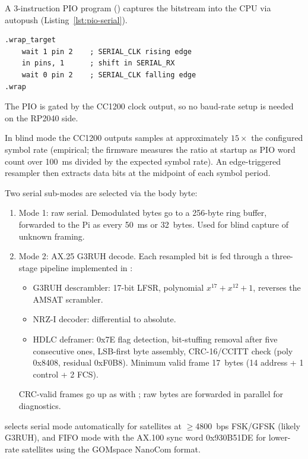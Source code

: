 A 3-instruction PIO program () captures the bitstream into the CPU via autopush (Listing~\ref{lst:pio-serial}).

\begin{lstlisting}[language={[x86masm]Assembler},
    caption={PIO program: clock-synchronous bit capture from the CC1200.},
    label={lst:pio-serial}]
.wrap_target
    wait 1 pin 2    ; SERIAL_CLK rising edge
    in pins, 1      ; shift in SERIAL_RX
    wait 0 pin 2    ; SERIAL_CLK falling edge
.wrap
\end{lstlisting}

The PIO is gated by the CC1200 clock output, so no baud-rate setup is needed on the RP2040 side.

In blind mode the CC1200 outputs samples at approximately $15\times$ the configured symbol rate (empirical; the firmware measures the ratio at startup as PIO word count over 100~ms divided by the expected symbol rate). An edge-triggered resampler then extracts data bits at the midpoint of each symbol period.

Two serial sub-modes are selected via the  body byte:

\begin{enumerate}
    \item Mode 1: raw serial. Demodulated bytes go to a 256-byte ring buffer, forwarded to the Pi as  every 50~ms or 32~bytes. Used for blind capture of unknown framing.
    \item Mode 2: AX.25 G3RUH decode. Each resampled bit is fed through a three-stage pipeline implemented in :
    \begin{itemize}
        \item G3RUH descrambler: 17-bit LFSR, polynomial $x^{17} + x^{12} + 1$, reverses the AMSAT scrambler.
        \item NRZ-I decoder: differential to absolute.
        \item HDLC deframer: 0x7E flag detection, bit-stuffing removal after five consecutive ones, LSB-first byte assembly, CRC-16/CCITT check (poly 0x8408, residual 0xF0B8). Minimum valid frame 17~bytes (14 address + 1 control + 2 FCS).
    \end{itemize}
    CRC-valid frames go up as  with ; raw bytes are forwarded in parallel for diagnostics.
\end{enumerate}

 selects serial mode automatically for satellites at $\geq$4800~bps FSK/GFSK (likely G3RUH), and FIFO mode with the AX.100 sync word 0x930B51DE for lower-rate satellites using the GOMspace NanoCom format.

